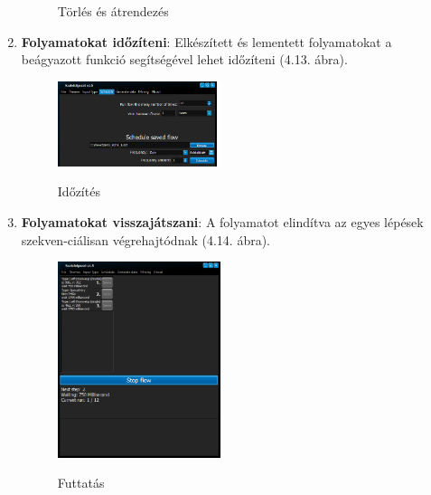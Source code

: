 \begin{enumerate}
{\begin{figure}[h!]
\begin{center}
				\caption{Törlés és átrendezés}
				\label{fig:example}
			\end{center}
		\end{figure}
	}
	\item{
		\textbf{Folyamatokat időzíteni}: Elkészített és lementett folyamatokat a beágyazott funkció segítségével lehet időzíteni (4.13. ábra).
		\begin{figure}[h!]
			\begin{center}
				\includegraphics[width=0.45\textwidth, keepaspectratio=true]{images/img_flow_schedule}\\
				\caption{Időzítés}
				\label{fig:example}
			\end{center}
		\end{figure}
	}
	\item{
		\textbf{Folyamatokat visszajátszani}: A folyamatot elindítva az egyes lépések szekven\hyp{}ciálisan végrehajtódnak (4.14. ábra).
		\begin{figure}[h!]
			\begin{center}
				\includegraphics[width=0.45\textwidth, keepaspectratio=true]{images/img_flow_run}\\
				\caption{Futtatás}
				\label{fig:example}
			\end{center}
		\end{figure}
	}

\end{enumerate}


